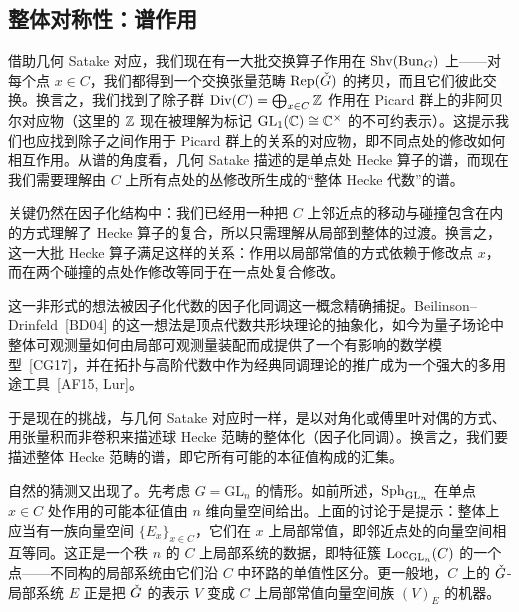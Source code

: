 \subsection{整体对称性：谱作用}\label{sec:3.5}

借助几何 Satake 对应，我们现在有一大批交换算子作用在 $\operatorname{Shv}(\operatorname{Bun}_{G})$ 上——对每个点 $x\in C$，我们都得到一个交换张量范畴 $\operatorname{Rep}(\check{G})$ 的拷贝，而且它们彼此交换。换言之，我们找到了除子群 $\mathrm{Div}(C)=\bigoplus_{x\in C}\mathbb{Z}$ 作用在 Picard 群上的非阿贝尔对应物（这里的 $\mathbb{Z}$ 现在被理解为标记 $\mathrm{GL}_{1}(\mathbb{C})\cong\mathbb{C}^{\times}$ 的不可约表示）。这提示我们也应找到除子之间作用于 Picard 群上的关系的对应物，即不同点处的修改如何相互作用。从谱的角度看，几何 Satake 描述的是单点处 Hecke 算子的谱，而现在我们需要理解由 $C$ 上所有点处的丛修改所生成的“整体 Hecke 代数”的谱。

关键仍然在因子化结构中：我们已经用一种把 $C$ 上邻近点的移动与碰撞包含在内的方式理解了 Hecke 算子的复合，所以只需理解从局部到整体的过渡。换言之，这一大批 Hecke 算子满足这样的关系：作用以局部常值的方式依赖于修改点 $x$，而在两个碰撞的点处作修改等同于在一点处复合修改。

这一非形式的想法被因子化代数的因子化同调这一概念精确捕捉。Beilinson–Drinfeld~[BD04] 的这一想法是顶点代数共形块理论的抽象化，如今为量子场论中整体可观测量如何由局部可观测量装配而成提供了一个有影响的数学模型~[CG17]，并在拓扑与高阶代数中作为经典同调理论的推广成为一个强大的多用途工具~[AF15, Lur]。

于是现在的挑战，与几何 Satake 对应时一样，是以对角化或傅里叶对偶的方式、用张量积而非卷积来描述球 Hecke 范畴的整体化（因子化同调）。换言之，我们要描述整体 Hecke 范畴的谱，即它所有可能的本征值构成的汇集。

自然的猜测又出现了。先考虑 $G=\mathrm{GL}_{n}$ 的情形。如前所述，$\operatorname{Sph}_{\mathrm{GL}_{n}}$ 在单点 $x\in C$ 处作用的可能本征值由 $n$ 维向量空间给出。上面的讨论于是提示：整体上应当有一族向量空间 $\{E_{x}\}_{x\in C}$，它们在 $x$ 上局部常值，即邻近点处的向量空间相互等同。这正是一个秩 $n$ 的 $C$ 上局部系统的数据，即特征簇 $\operatorname{Loc}_{\mathrm{GL}_{n}}(C)$ 的一个点——不同构的局部系统由它们沿 $C$ 中环路的单值性区分。更一般地，$C$ 上的 $\check{G}$-局部系统 $E$ 正是把 $\check{G}$ 的表示 $V$ 变成 $C$ 上局部常值向量空间族 $(V)_{E}$ 的机器。

